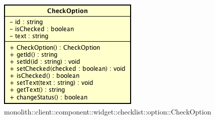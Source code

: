 \label{monolith::client::component::widget::checklist::option::CheckOption}
\begin{figure}[H]
	\centering
	\includegraphics[scale=0.5]{Sezioni/SottosezioniST/img/CheckOption.png}
	\caption{monolith::client::component::widget::checklist::option::CheckOption}
\end{figure}

